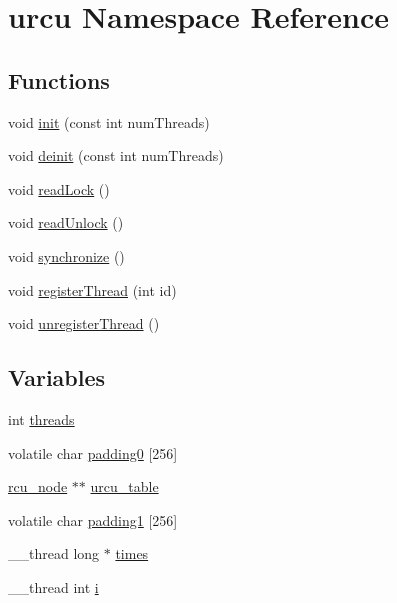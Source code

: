 \hypertarget{namespaceurcu}{}\section{urcu Namespace Reference}
\label{namespaceurcu}
\subsection*{Functions}
\begin{DoxyCompactItemize}
\item 
void \hyperlink{namespaceurcu_ae71ce69710f4a5bcb4bfc31df8ee85b8}{init} (const int num\+Threads)
\item 
void \hyperlink{namespaceurcu_a4c5c060c1f3a160b1eeb3be3c3f98695}{deinit} (const int num\+Threads)
\item 
void \hyperlink{namespaceurcu_ac3f9e7761be4b1daf2603bc8c8a4c205}{read\+Lock} ()
\item 
void \hyperlink{namespaceurcu_a1d3b27b2ee4acc50da4a0577f18b6ab9}{read\+Unlock} ()
\item 
void \hyperlink{namespaceurcu_a92fb7548f9a8dbd5e1d8a4dbfb79cfdc}{synchronize} ()
\item 
void \hyperlink{namespaceurcu_a49bcb7fc416b2a8a251c8d33cf5a360e}{register\+Thread} (int id)
\item 
void \hyperlink{namespaceurcu_a05c52d5621cdd270fae5652f85bde20b}{unregister\+Thread} ()
\end{DoxyCompactItemize}
\subsection*{Variables}
\begin{DoxyCompactItemize}
\item 
int \hyperlink{namespaceurcu_a2b3af723db3f4d2181361fdf3b1ca01b}{threads}
\item 
volatile char \hyperlink{namespaceurcu_aad16bc4b7e272ecbaa3c34be47d807e9}{padding0} \mbox{[}256\mbox{]}
\item 
\hyperlink{urcu_8h_ac2bcfc00b81eeb475f88cc3573dab80c}{rcu\+\_\+node} $\ast$$\ast$ \hyperlink{namespaceurcu_ac8ddff08c7aa9fc363ae6b0017bf0cc0}{urcu\+\_\+table}
\item 
volatile char \hyperlink{namespaceurcu_acb27bb6447087498d8ee235c7d018c56}{padding1} \mbox{[}256\mbox{]}
\item 
\+\_\+\+\_\+thread long $\ast$ \hyperlink{namespaceurcu_a15a6e6706adc428b9a16ee6170f73835}{times}
\item 
\+\_\+\+\_\+thread int \hyperlink{namespaceurcu_a536341e353c82c078bc510ca0144dd58}{i}
\end{DoxyCompactItemize}


